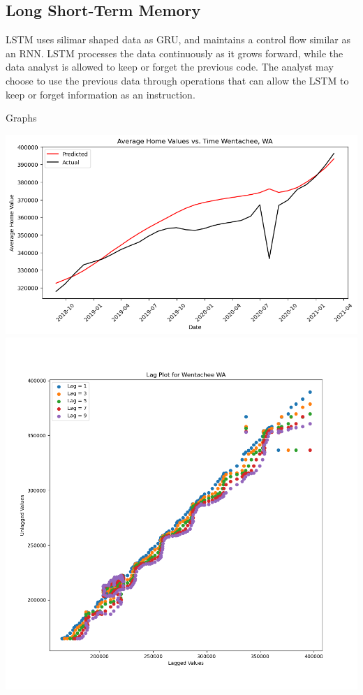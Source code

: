 \documentclass{article}
\begin{document}
	\subsection{Long Short-Term Memory}
	
	LSTM uses silimar shaped data as GRU, and maintains a control flow similar as an RNN. LSTM processes the data continuously as it grows 
	forward, while the data analyst is allowed to keep or forget the previous code. The analyst may choose to use the previous data through
	operations that can allow the LSTM to keep or forget information as an instruction.

	Graphs
	
	\includegraphics[scale = 0.4]{../plots/wentachee_1d_lstm.png}
	\includegraphics[scale = 0.4]{../plots/wentachee_lag.png}
\end{document}
